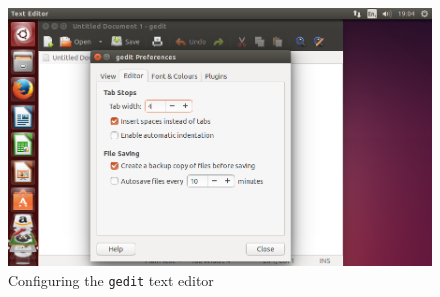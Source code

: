 \documentclass[a4paper,twoside,titlepage]{memoir}
\newcommand{\shellcmd}{\texttt}
\begin{document}
\begin{figure}
	\includegraphics[width=\textwidth]{gedit.png}
	\caption{Configuring the \shellcmd{gedit} text editor}
	\label{fig:gedit}
\end{figure}
\end{document}

